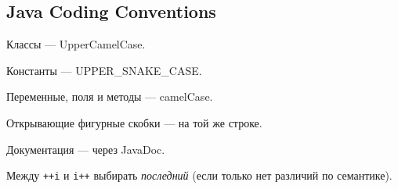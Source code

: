 \subsection{Java Coding Conventions}
Классы --- UpperCamelCase.

Константы --- UPPER\_SNAKE\_CASE.

Переменные, поля и методы --- camelCase.

Открывающие фигурные скобки --- на той же строке.

Документация --- через JavaDoc.

Между \texttt{++i} и \texttt{i++} выбирать \emph{последний} (если только нет различий по семантике).
